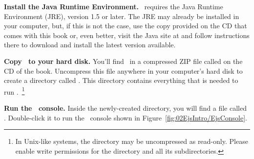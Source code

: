 \begin{numberlist}

\item \textbf{Install the Java Runtime Environment.} \ejs\ requires the Java Runtime Environment (JRE), version 1.5 or later.
The JRE may already be installed in your computer, but, if this is not the case, use the copy provided on the CD that
comes with this book or, even better, visit the Java site at  and follow instructions there
to download and install the latest version available.

\item \textbf{Copy \ejs\ to your hard disk.} You'll find \ejs\ in a compressed ZIP file called  on the CD of the book.
Uncompress this file anywhere in your computer's hard disk to create a directory called . This directory
contains everything that is needed to run \ejs.~\footnote{In Unix-like systems, the  directory may be
uncompressed as read-only. Please enable write permissions for the  directory and all its subdirectories.}

\item \textbf{Run the \ejs\ console.} Inside the newly-created  directory, you will find a file called
. Double-click it to run the
\ejs\ console shown in Figure~\ref{fig:02EjsIntro/EjsConsole}.


\end{numberlist}
